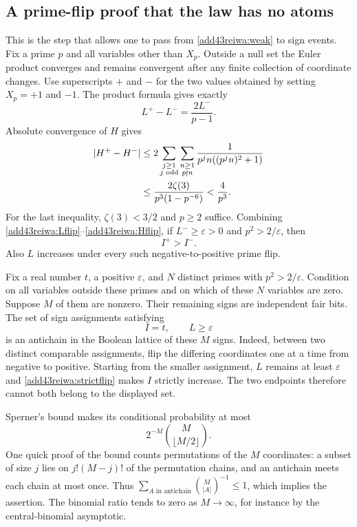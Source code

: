 \documentclass[11pt,a4paper]{article}
\numberwithin{equation}{section}
\theoremstyle{definition}
\theoremstyle{remark}
\begin{document}
\subsection{A prime-flip proof that the law has no atoms}
This is the step that allows one to pass from \eqref{add43reiwa:weak} to sign
events. Fix a prime $p$ and all variables other than $X_p$. Outside
a null set the Euler product converges and remains convergent after
any finite collection of coordinate changes. Use superscripts $+$
and $-$ for the two values obtained by setting $X_p=+1$ and $-1$.
The product formula gives exactly
\begin{equation}\label{add43reiwa:Lflip}
                 L^+-L^-=\frac{2L^-}{p-1}.
\end{equation}
Absolute convergence of $H$ gives
\begin{align}
 |H^+-H^-|
 &\le2\sum_{\substack{j\ge1\\j\text{ odd}}}
             \sum_{\substack{n\ge1\\p\nmid n}}
           \frac1{p^jn((p^jn)^2+1)} \notag\\
 &\le\frac{2\zeta(3)}{p^3(1-p^{-6})}
       <\frac4{p^3}.                              \label{add43reiwa:Hflip}
\end{align}
For the last inequality, $\zeta(3)<3/2$ and $p\ge2$ suffice.
Combining \eqref{add43reiwa:Lflip}--\eqref{add43reiwa:Hflip}, if $L^-\ge\varepsilon>0$
and $p^2>2/\varepsilon$, then
\begin{equation}\label{add43reiwa:strictflip}
                         I^+>I^-.
\end{equation}
Also $L$ increases under every such negative-to-positive prime flip.

Fix a real number $t$, a positive $\varepsilon$, and $N$ distinct
primes with $p^2>2/\varepsilon$. Condition on all variables outside
these primes and on which of these $N$ variables are zero. Suppose
$M$ of them are nonzero. Their remaining signs are independent fair
bits. The set of sign assignments satisfying
\[
                         I=t,\qquad L\ge\varepsilon
\]
is an antichain in the Boolean lattice of these $M$ signs. Indeed,
between two distinct comparable assignments, flip the differing
coordinates one at a time from negative to positive. Starting from
the smaller assignment, $L$ remains at least $\varepsilon$ and
\eqref{add43reiwa:strictflip} makes $I$ strictly increase. The two endpoints
therefore cannot both belong to the displayed set.

Sperner's bound makes its conditional probability at most
\[
                  2^{-M}\binom{M}{\lfloor M/2\rfloor}.
\]
One quick proof of the bound counts permutations of the $M$ coordinates:
a subset of size $j$ lies on $j!(M-j)!$ of the permutation chains,
and an antichain meets each chain at most once. Thus
$\sum_{A\text{ in antichain}}\binom{M}{|A|}^{-1}\le1$, which
implies the assertion. The binomial ratio tends to zero as
$M\to\infty$, for instance by the central-binomial asymptotic.
\end{document}
